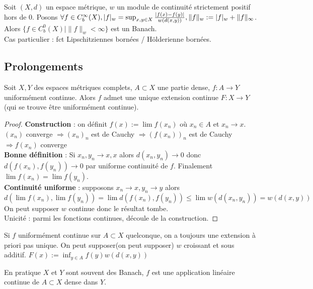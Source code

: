 \begin{ex}
    Soit $(X,d)$ un espace métrique, $w$ un module de continuité strictement positif hors de 0. Posons $\forall f\in C^\infty _b(X),\\ |f|_w=\sup_{x,y\in X}\frac{|f(x)-f(y)|}{w(d(x,y))},\|f\|_w:=|f|_w+\|f\|_\infty $. \\
    Alors $\{f\in C^0_b(X)|\|f\|_w<\infty \} $ est un Banach.\\
    Cas particulier : fct Lipschitziennes bornées / Hölderienne bornées.
\end{ex}

\subsection{Prolongements}
\begin{propriete} Soit $X,Y$ des espaces métriques complets, $A\subset X$ une partie dense, $f:A\to Y$ uniformément continue. Alors $f$ admet une unique extension continue $F:X\to Y$ (qui se trouve être uniformément continue).
\end{propriete}
\begin{proof}
    \textbf{Construction} : on définit $f(x):=\lim f(x_n)$ où $x_{n}\in A$ et $x_{n}\to x$. $(x_{n})$ converge $\Rightarrow (x_{n})_n$ est de Cauchy $\Rightarrow (f(x_n))_n$ est de Cauchy $\Rightarrow f(x_{n})$ converge \\
    \textbf{Bonne définition} : Si $x_{n},y_n \to x,x$ alors $d(x_{n},y_n)\to 0$ donc \\$d(f(x_{n}),f(y_n))\to 0$ par uniforme continuité de $f$. Finalement \\$\lim f(x_{n})=\lim f(y_n).$ \\
\textbf{Continuité uniforme} : supposons $x_{n}\to x, y_n\to y$ alors
$$d(\lim f(x_{n}), \lim f(y_n))=\lim d(f(x_{n}),f(y_n))\le \lim w(d(x_{n},y_n))=w(d(x,y))$$
On peut supposer $w$ continue donc le résultat tombe.\\
    Unicité : parmi les fonctions continues, découle de la construction.
\end{proof}
\begin{remarque}  Si $f$ uniformément continue sur $A\subset X$ quelconque, on a toujours une extension à priori pas unique. On peut supposer(on peut supposer) $w$ croissant et sous additif. $F(x):=\inf_{y\in A}f(y)w(d(x,y))$
\end{remarque}
\begin{remarque}
    En pratique $X$ et $Y$ sont souvent des Banach, $f$ est une application linéaire continue de $A\subset X$ dense dans $Y$.
\end{remarque}
